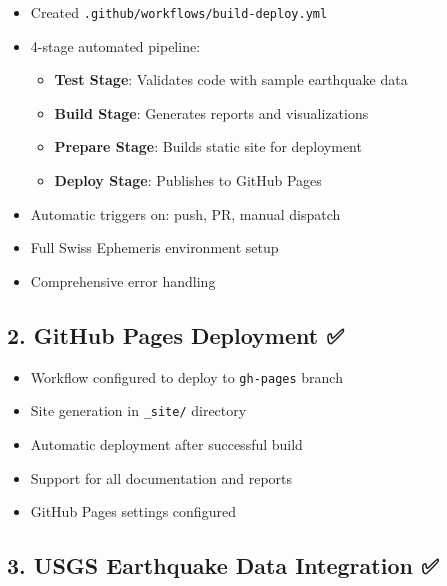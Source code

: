\documentclass[
  11pt,
  oneside,
  openany]{scrbook}
\providecommand{\tightlist}{%
  \setlength{\itemsep}{0pt}\setlength{\parskip}{0pt}}\usepackage{longtable,booktabs,array}
\begin{document}
\begin{itemize}
\tightlist
\item[$\boxtimes$]
  Created \texttt{.github/workflows/build-deploy.yml}
\item[$\boxtimes$]
  4-stage automated pipeline:

  \begin{itemize}
  \tightlist
  \item
    \textbf{Test Stage}: Validates code with sample earthquake data
  \item
    \textbf{Build Stage}: Generates reports and visualizations
  \item
    \textbf{Prepare Stage}: Builds static site for deployment
  \item
    \textbf{Deploy Stage}: Publishes to GitHub Pages
  \end{itemize}
\item[$\boxtimes$]
  Automatic triggers on: push, PR, manual dispatch
\item[$\boxtimes$]
  Full Swiss Ephemeris environment setup
\item[$\boxtimes$]
  Comprehensive error handling
\end{itemize}

\subsection{\texorpdfstring{2. \textbf{GitHub Pages Deployment}
✅}{2. GitHub Pages Deployment ✅}}\label{github-pages-deployment}

\begin{itemize}
\tightlist
\item[$\boxtimes$]
  Workflow configured to deploy to \texttt{gh-pages} branch
\item[$\boxtimes$]
  Site generation in \texttt{\_site/} directory
\item[$\boxtimes$]
  Automatic deployment after successful build
\item[$\boxtimes$]
  Support for all documentation and reports
\item[$\boxtimes$]
  GitHub Pages settings configured
\end{itemize}

\subsection{\texorpdfstring{3. \textbf{USGS Earthquake Data Integration}
✅}{3. USGS Earthquake Data Integration ✅}}\label{usgs-earthquake-data-integration}
\end{document}
